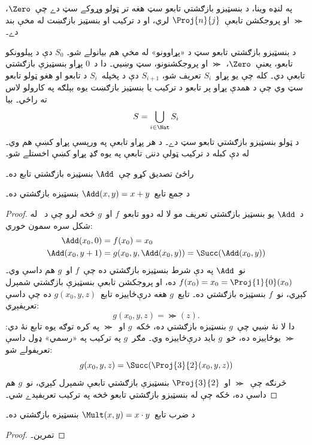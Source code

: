 \documentclass[../../../include/open-logic-section]{subfiles}
\begin{document}
\begin{explain}
په لنډه وينا، د بنسټيزو بازګشتي تابعو سټ هغه تر ټولو وړوکے سټ دے
چې~$\Zero$، $\Succ$ او پروجکشن تابعې~$\Proj{n}{j}$ لري، او د ترکيب
او بنسټيز بازګښت له مخې بند دے۔

د بنسټيزو بازګشتي تابعو سټ د «پړاوونو» له مخې هم بيانولے شو۔
$S_0$ دې د پيلوونکو تابعو، يعنې~$\Zero$، $\Succ$ او پروجکشنونو، سټ
وښيي۔ دا د~$0$ پړاو بنسټيزې بازګشتي تابعې دي۔ کله چې يو
پړاو~$S_i$ تعريف شو، $S_{i+1}$ دې د پخپله~$S_i$ د تابعو او هغو
ټولو تابعو سټ وي چې د همدې پړاو پر تابعو د ترکيب يا بنسټيز بازګښت
يوه بېلګه په کارولو لاس ته راځي۔ بيا
\[
S = \bigcup_{i \in \Nat} S_i
\]
د ټولو بنسټيزو بازګشتي تابعو سټ دے۔
د هر پړاو تابعې په ورپسې پړاو کښې هم وي۔ له دې کبله د ترکيب ټولې دننۍ تابعې په يوه ګډ پړاو کښې اخستلے شو۔
\end{explain}

راځئ تصديق کړو چې~$\Add$ بنسټيزه بازګشتي تابع ده۔

\begin{prop}
  د جمع تابع~$\Add(x,y) = x+y$ بنسټيزه بازګشتي ده۔
\end{prop}

\begin{proof}
د~$\Add$ يو بنسټيز بازګشتي تعريف مو لا له دوو تابعو~$f$ او~$g$ څخه
لرو چې د~ له شکل سره سمون خوري:
\begin{align*}
  \Add(x_0, 0) & = f(x_0) = x_0\\
  \Add(x_0, y+1) & = g(x_0, y, \Add(x_0, y)) =
  \Succ(\Add(x_0, y))
\end{align*}
نو~$\Add$ په دې شرط بنسټيزه بازګشتي ده چې~$f$ او~$g$ هم داسې وي۔
$f(x_0) = x_0 = \Proj{1}{0}(x_0)$ ده، او پروجکشن تابعې بنسټيزې
بازګشتي شمېرل کېږي، نو~$f$ بنسټيزه بازګشتي ده۔ تابع~$g$ هغه
درې‌ځاييزه تابع~$g(x_0, y, z)$ ده چې داسې تعريفېږي:
\[
g(x_0, y, z) = \Succ(z).
\]
دا لا نۀ ښيي چې~$g$ بنسټيزه بازګشتي ده، ځکه~$g$ او~$\Succ$ په کره
توګه يوه تابع نۀ دي: $\Succ$ يوځاييزه ده، خو~$g$ بايد درې‌ځاييزه
وي۔ مګر~$g$ په ترکيب په «رسمي» ډول داسې تعريفولے شو:
\[
g(x_0, y, z) = \Succ(\Proj{3}{2}(x_0, y, z))
\]
څرنګه چې~$\Succ$ او~$\Proj{3}{2}$ بنسټيزې بازګشتي تابعې شمېرل
کېږي، نو~$g$ هم داسې ده، ځکه چې له بنسټيزو بازګشتي تابعو څخه په
ترکيب تعريفېدے شي۔
\end{proof}

\begin{prop}
  د ضرب تابع~$\Mult(x,y) = x \cdot y$ بنسټيزه بازګشتي ده۔
\end{prop}

\begin{proof}
  تمرين۔
\end{proof}
\end{document}
